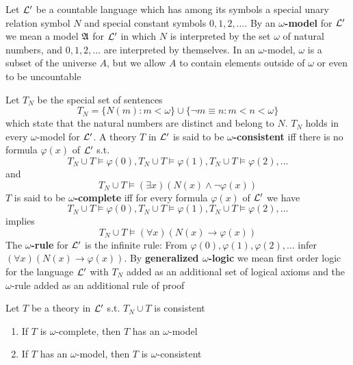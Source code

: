 \documentclass[11pt]{article}
\begin{document}
\begin{examplle}[Continue]
Let \(\mathcal{L}'\) be a countable language which has among its
symbols a special unary relation symbol \(N\) and special constant symbols
\(0,1,2,\dots\).
By an \textbf{\(\omega\)-model} for \(\mathcal{L}'\) we mean a model \(\mathfrak{A}\) for \(\mathcal{L}'\)
in which \(N\) is interpreted by the set \(\omega\) of natural numbers, and
\(0,1,2,\dots\) are interpreted by themselves. In an \(\omega\)-model, \(\omega\) is a
subset of the universe \(A\), but we allow \(A\) to contain elements outside
of \(\omega\) or even to be uncountable

Let \(T_N\) be the special set of sentences
\begin{equation*}
T_N=\{N(m):m<\omega\}\cup\{\neg m\equiv n:m<n<\omega\}
\end{equation*}
which state that the natural numbers are distinct and belong to \(N\).
\(T_N\) holds in every \(\omega\)-model for \(\mathcal{L}'\). A theory \(T\) in
\(\mathcal{L}'\) is said to be \textbf{\(\omega\)-consistent} iff there is no formula
\(\varphi(x)\) of \(\mathcal{L}'\) s.t.
\begin{equation*}
T_N\cup T\models\varphi(0),T_N\cup T\models\varphi(1),
T_N\cup T\models\varphi(2),\dots
\end{equation*}
and
\begin{equation*}
T_N\cup T\models(\exists x)(N(x)\wedge\neg\varphi(x))
\end{equation*}
\(T\) is said to be \textbf{\(\omega\)-complete} iff for every formula \(\varphi(x)\) of
\(\mathcal{L}'\) we have
\begin{equation*}
T_N\cup T\models\varphi(0),T_N\cup T\models\varphi(1),T_N\cup T\models\varphi(2),\dots
\end{equation*}
implies
\begin{equation*}
T_N\cup T\models(\forall x)(N(x)\to\varphi(x))
\end{equation*}
The \textbf{\(\omega\)-rule} for \(\mathcal{L}'\) is the infinite rule: From
\(\varphi(0),\varphi(1),\varphi(2),\dots\) infer \((\forall x)(N(x)\to\varphi(x))\). By
\textbf{generalized \(\omega\)-logic} we mean first order logic for the language
\(\mathcal{L}'\) with \(T_N\) added as an additional set of logical axioms and the
\(\omega\)-rule added as an additional rule of proof
\end{examplle}

\begin{proposition}[]
Let \(T\) be a theory in \(\mathcal{L}'\) s.t. \(T_N\cup T\) is consistent
\begin{enumerate}
\item If \(T\) is \(\omega\)-complete, then \(T\) has an \(\omega\)-model
\item If \(T\) has an \(\omega\)-model, then \(T\) is \(\omega\)-consistent
\end{enumerate}
\end{proposition}
\end{document}
